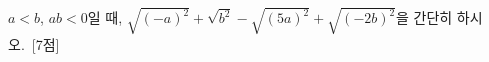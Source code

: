 $a<b$, $ab<0$일 때, $\sqrt{(-a)^2}+\sqrt{b^2}-\sqrt{(5a)^2}+\sqrt{(-2b)^2}$을 간단히 하시오.~\mbox{\mbox{[7점]}}
